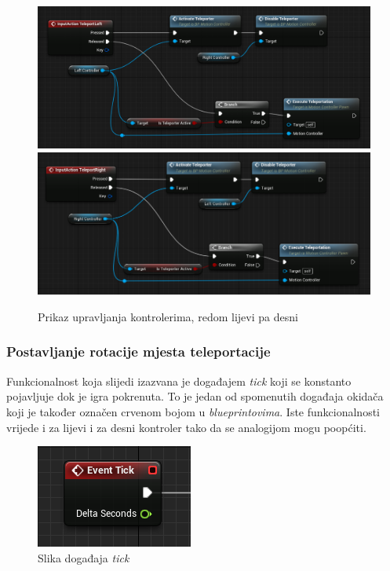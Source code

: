 \documentclass[a4paper,10pt]{article}
\begin{document}
\begin{figure}[!h]
	\centering
	\includegraphics[width=\textwidth]{slike/06.png}
	\includegraphics[width=\textwidth]{slike/07.png}
	\caption{Prikaz upravljanja kontrolerima, redom lijevi pa desni}
	\label{s06}
\end{figure}

\subsubsection{Postavljanje rotacije mjesta teleportacije}

Funkcionalnost koja slijedi izazvana je događajem \textit{tick} koji se konstanto
pojavljuje dok je igra pokrenuta. To je jedan od spomenutih događaja okidača
koji je također označen crvenom bojom u \textit{blueprintovima}. Iste
funkcionalnosti vrijede i za lijevi i za desni kontroler tako da se analogijom
mogu poopćiti.

\begin{figure}[!h]
	\centering
	\includegraphics[]{slike/08.png}
	\caption{Slika događaja \textit{tick}}
\end{figure}
\end{document}
